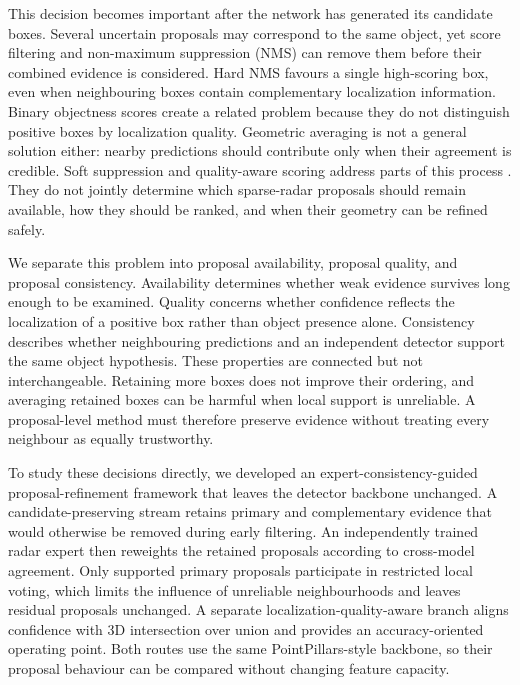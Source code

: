 \documentclass[sensors,article,submit,pdftex,moreauthors]{Definitions/mdpi}
\begin{document}
This decision becomes important after the network has generated its candidate
boxes. Several uncertain proposals may correspond to the same object, yet
score filtering and non-maximum suppression (NMS) can remove them before their
combined evidence is considered. Hard NMS favours a single high-scoring box,
even when neighbouring boxes contain complementary localization information.
Binary objectness scores create a related problem because they do not
distinguish positive boxes by localization quality. Geometric averaging is not
a general solution either: nearby predictions should contribute only when
their agreement is credible. Soft suppression and quality-aware scoring address
parts of this process \cite{bodla2017softnms,li2022gfl,
zhang2021varifocalnet}. They do not jointly determine which sparse-radar
proposals should remain available, how they should be ranked, and when their
geometry can be refined safely.

We separate this problem into proposal availability, proposal quality, and
proposal consistency. Availability determines whether weak evidence survives
long enough to be examined. Quality concerns whether confidence reflects the
localization of a positive box rather than object presence alone. Consistency
describes whether neighbouring predictions and an independent detector support
the same object hypothesis. These properties are connected but not
interchangeable. Retaining more boxes does not improve their ordering, and
averaging retained boxes can be harmful when local support is unreliable. A
proposal-level method must therefore preserve evidence without treating every
neighbour as equally trustworthy.

To study these decisions directly, we developed an
expert-consistency-guided proposal-refinement framework that leaves the
detector backbone unchanged. A candidate-preserving stream retains primary and
complementary evidence that would otherwise be removed during early filtering.
An independently trained radar expert then reweights the retained proposals
according to cross-model agreement. Only supported primary proposals
participate in restricted local voting, which limits the influence of
unreliable neighbourhoods and leaves residual proposals unchanged. A separate
localization-quality-aware branch aligns confidence with 3D intersection over
union and provides an accuracy-oriented operating point. Both routes use the
same PointPillars-style backbone, so their proposal behaviour can be compared
without changing feature capacity.
\end{document}
